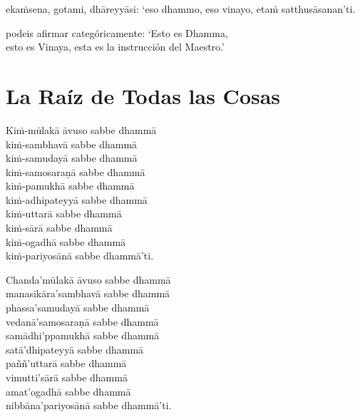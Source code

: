ekaṁsena, gotami, dhāreyyāsi: ‘eso dhammo, eso vinayo, etaṁ satthusāsanan’ti.

\begin{english}
  podeis afirmar categóricamente: ‘Esto es Dhamma,\\
  esto es Vinaya, esta es la instrucción del Maestro.’
\end{english}

\chapter{La Raíz de Todas las Cosas}



\begin{leader}
\end{leader}

\enlargethispage{2\baselineskip}

Kiṁ-mūlakā āvuso sabbe dhammā\\
kiṁ-sambhavā sabbe dhammā\\
kiṁ-samudayā sabbe dhammā\\
kiṁ-samosaraṇā sabbe dhammā\\
kiṁ-pamukhā sabbe dhammā\\
kiṁ-adhipateyyā sabbe dhammā\\
kiṁ-uttarā sabbe dhammā\\
kiṁ-sārā sabbe dhammā\\
kiṁ-ogadhā sabbe dhammā\\
kiṁ-pariyosānā sabbe dhammā'ti.

Chanda'mūlakā āvuso sabbe dhammā\\
manasikāra'sambhavā sabbe dhammā\\
phassa'samudayā sabbe dhammā\\
vedanā'samosaraṇā sabbe dhammā\\
samādhi'ppamukhā sabbe dhammā\\
satā'dhipateyyā sabbe dhammā\\
paññ'uttarā sabbe dhammā\\
vimutti'sārā sabbe dhammā\\
amat'ogadhā sabbe dhammā\\
nibbāna'pariyosānā sabbe dhammā'ti.

